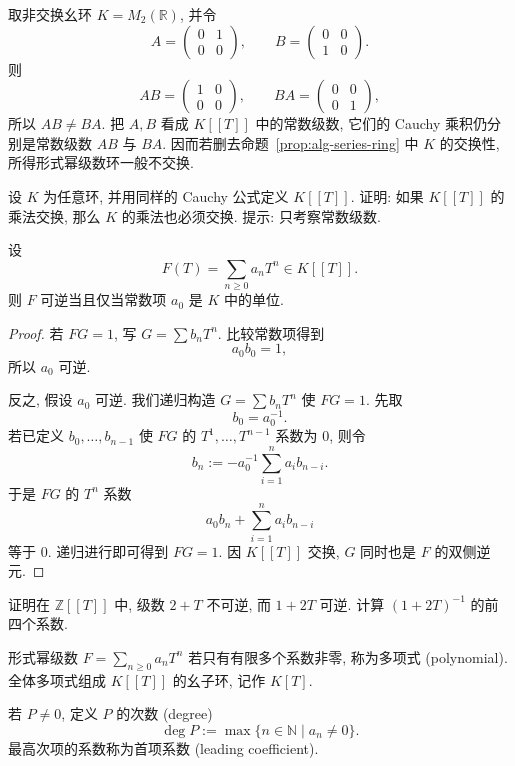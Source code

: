 \documentclass[usesamecnt, thmcnt=section, lang=cn, newtx, 10pt, scheme=chinese]{elegantbook}
\begin{document}
\begin{instance}
取非交换幺环 $K=M_2(\mathbb R)$, 并令
\[
 A=\begin{pmatrix}0&1\\0&0\end{pmatrix},
 \qquad
 B=\begin{pmatrix}0&0\\1&0\end{pmatrix}.
\]
则
\[
 AB=\begin{pmatrix}1&0\\0&0\end{pmatrix},
 \qquad
 BA=\begin{pmatrix}0&0\\0&1\end{pmatrix},
\]
所以 $AB\neq BA$. 把 $A,B$ 看成 $K[\![T]\!]$ 中的常数级数, 它们的 Cauchy 乘积仍分别是常数级数 $AB$ 与 $BA$. 因而若删去命题~\ref{prop:alg-series-ring} 中 $K$ 的交换性, 所得形式幂级数环一般不交换.
\end{instance}

\begin{exercise}\label{ex:alg-series-commutative}
设 $K$ 为任意环, 并用同样的 Cauchy 公式定义 $K[\![T]\!]$. 证明: 如果 $K[\![T]\!]$ 的乘法交换, 那么 $K$ 的乘法也必须交换. 提示: 只考察常数级数.
\end{exercise}

\begin{proposition}\label{prop:alg-series-unit}
设
\[
 F(T)=\sum_{n\geq0}a_nT^n\in K[\![T]\!].
\]
则 $F$ 可逆当且仅当常数项 $a_0$ 是 $K$ 中的单位.
\end{proposition}

\begin{proof}
若 $FG=1$, 写 $G=\sum b_nT^n$. 比较常数项得到
\[
 a_0b_0=1,
\]
所以 $a_0$ 可逆.

反之, 假设 $a_0$ 可逆. 我们递归构造 $G=\sum b_nT^n$ 使 $FG=1$. 先取
\[
 b_0=a_0^{-1}.
\]
若已定义 $b_0,\ldots,b_{n-1}$ 使 $FG$ 的 $T^1,\ldots,T^{n-1}$ 系数为 $0$, 则令
\[
 b_n:=-a_0^{-1}\sum_{i=1}^{n}a_i b_{n-i}.
\]
于是 $FG$ 的 $T^n$ 系数
\[
 a_0b_n+\sum_{i=1}^na_ib_{n-i}
\]
等于 $0$. 递归进行即可得到 $FG=1$. 因 $K[\![T]\!]$ 交换, $G$ 同时也是 $F$ 的双侧逆元.
\end{proof}

\begin{exercise}\label{ex:alg-series-constant}
证明在 $\mathbb Z[\![T]\!]$ 中, 级数 $2+T$ 不可逆, 而 $1+2T$ 可逆. 计算 $(1+2T)^{-1}$ 的前四个系数.
\end{exercise}

\begin{definition}[多项式与次数]\label{def:alg-polynomial}
形式幂级数 $F=\sum_{n\geq0}a_nT^n$ 若只有有限多个系数非零, 称为{\color{blue}多项式 (polynomial)}. 全体多项式组成 $K[\![T]\!]$ 的幺子环, 记作 $K[T]$.

若 $P\neq0$, 定义 $P$ 的{\color{blue}次数 (degree)}
\[
 \deg P:=\max\{n\in\mathbb N\mid a_n\neq0\}.
\]
最高次项的系数称为{\color{blue}首项系数 (leading coefficient)}.
\end{definition}
\end{document}
